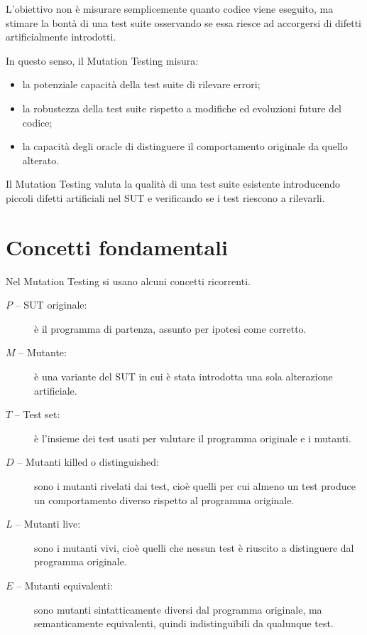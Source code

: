 L'obiettivo non è misurare semplicemente quanto codice viene eseguito, ma stimare la bontà di una test suite osservando se essa riesce ad accorgersi di difetti artificialmente introdotti.

In questo senso, il Mutation Testing misura:

\begin{itemize}
    \item la potenziale capacità della test suite di rilevare errori;
    \item la robustezza della test suite rispetto a modifiche ed evoluzioni future del codice;
    \item la capacità degli oracle di distinguere il comportamento originale da quello alterato.
\end{itemize}

\begin{notaesame}
Il Mutation Testing valuta la qualità di una test suite esistente introducendo piccoli difetti artificiali nel SUT e verificando se i test riescono a rilevarli.
\end{notaesame}

\section{Concetti fondamentali}

Nel Mutation Testing si usano alcuni concetti ricorrenti.

\begin{description}
    \item[\(P\) -- SUT originale:] è il programma di partenza, assunto per ipotesi come corretto.

    \item[\(M\) -- Mutante:] è una variante del SUT in cui è stata introdotta una sola alterazione artificiale.

    \item[\(T\) -- Test set:] è l'insieme dei test usati per valutare il programma originale e i mutanti.

    \item[\(D\) -- Mutanti killed o distinguished:] sono i mutanti rivelati dai test, cioè quelli per cui almeno un test produce un comportamento diverso rispetto al programma originale.

    \item[\(L\) -- Mutanti live:] sono i mutanti vivi, cioè quelli che nessun test è riuscito a distinguere dal programma originale.

    \item[\(E\) -- Mutanti equivalenti:] sono mutanti sintatticamente diversi dal programma originale, ma semanticamente equivalenti, quindi indistinguibili da qualunque test.
\end{description}

